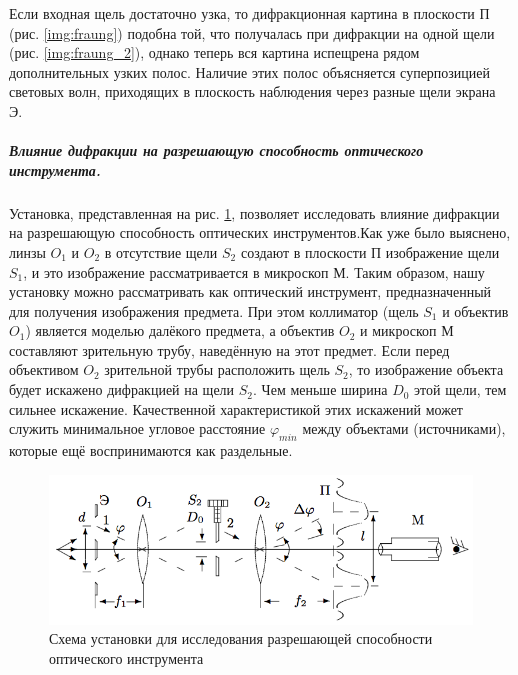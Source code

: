 \documentclass[12pt]{article}
\renewcommand{\phi}{\ensuremath{\varphi}}
\newcommand{\lw}{\linewidth}
\begin{document}
	Если входная щель достаточно узка, то дифракционная картина в плоскости П (рис. \ref{img:fraung}) подобна той, что получалась при дифракции на одной щели (рис. \ref{img:fraung_2}), однако теперь вся картина испещрена рядом дополнительных узких полос. Наличие этих полос объясняется суперпозицией световых волн, приходящих в плоскость наблюдения через разные щели экрана Э.
	
	
	\subparagraph{Влияние дифракции на разрешающую способность оптического инструмента.}
	Установка, представленная на рис. \ref{img:dif}, позволяет исследовать влияние дифракции на разрешающую способность оптических инструментов.Как уже было выяснено, линзы $O_1$ и $O_2$ в отсутствие щели $S_2$ создают в плоскости П изображение щели $S_1$, и это изображение рассматривается в микроскоп М. Таким образом, нашу установку можно рассматривать как оптический инструмент, предназначенный для получения изображения предмета. При этом коллиматор (щель $S_1$ и объектив $O_1$) является моделью далёкого предмета, а объектив $O_2$ и микроскоп М составляют зрительную трубу, наведённую на этот предмет.
	Если перед объективом $O_2$ зрительной трубы расположить щель $S_2$, то изображение объекта будет искажено дифракцией на щели $S_2$. Чем меньше ширина $D_0$ этой щели, тем сильнее искажение. Качественной характеристикой этих искажений может служить минимальное угловое расстояние $\phi_{min}$ между объектами (источниками), которые ещё воспринимаются как раздельные.
	
	\begin{figure}[h]
		\centering
		\includegraphics[width = 0.9 \lw]{img4}
		\caption{Схема установки для исследования разрешающей способности оптического инструмента}
		\label{img:dif}
	\end{figure}
	
\end{document}

